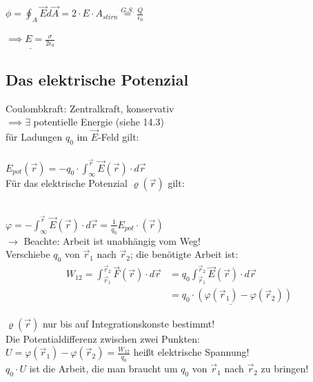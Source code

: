 \documentclass[11pt]{article}
\begin{document}
$ \phi=\oint_{A} \vec{E}d\vec{A}=2\cdot E\cdot A_{stirn}\overset{G.S.}{=}\frac{Q}{\epsilon_0}$ 

$ \underline{\implies E=\frac{\sigma}{2\epsilon_0}} $

\subsection{Das elektrische Potenzial}

Coulombkraft: Zentralkraft, konservativ\\
$\implies \exists$ potentielle Energie (siehe 14.3)\\
für Ladungen $q_0$ im $\vec{E}$-Feld gilt:\\

\hfill\\
$\boxed{\displaystyle E_{pot}(\vec{r})=-q_0\cdot\int_{\infty}^{\vec{r}} \vec{E}(\vec{r})\cdot d\vec{r}}$
\hfill\\

Für das elektrische Potenzial $ \varrho(\vec{r}) $ gilt:

\hfill\\
$\boxed{\displaystyle\varphi=-\int_{\infty}^{\vec{r}} \vec{E}(\vec{r})\cdot d\vec{r} = \frac{1}{q_0}E_{pot}\cdot (\vec{r})}$
\hfill\\

$\rightarrow$ Beachte: Arbeit ist unabhängig vom Weg!\\
Verschiebe $q_0$ von $\vec{r}_1$ nach $\vec{r}_2$; die benötigte Arbeit ist:\\

\begin{align*}
	\displaystyle W_{12}= \int_{\vec{r}_1}^{\vec{r}_2} \vec{F}(\vec{r})\cdot d\vec{r} & = q_0\int_{\vec{r}_1}^{\vec{r}_2} \vec{E}(\vec{r})\cdot d\vec{r} \\
	&\underline{ =q_0\cdot(\varphi(\vec{r}_1)-\varphi(\vec{r}_2))}
\end{align*}

$ \varrho(\vec{r}) $ nur bis auf Integrationskonste bestimmt!\\
Die Potentialdifferenz zwischen zwei Punkten:\\

$ U = \varphi(\vec{r}_1)-\varphi(\vec{r}_2) = \frac{W_{12}}{q_0}$ hei\ss{}t elektrische Spannung!\\

$q_0\cdot U$ ist die Arbeit, die man braucht um $q_0$ von $ \vec{r}_1 $ nach $ \vec{r}_2 $ zu bringen!\\
\end{document}
